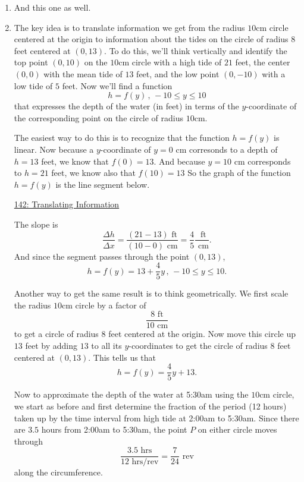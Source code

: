 \documentclass{ximera}
\begin{document}
\begin{example}
\begin{explanation}
\begin{enumerate}
\item And this one as well.

\item The key idea is to translate information we get from the radius $10$cm circle centered at the origin to information about the tides on the circle of radius $8$ feet centered at $(0,13)$. To do this, we'll think vertically and identify the top point $(0,10)$ on the $10$cm circle with a high tide of $21$ feet, the center $(0,0)$ with the mean tide of $13$ feet, and the low point $(0,-10)$ with a low tide of $5$ feet. Now we'll find a function
\[
 h = f(y) \, , \, -10 \leq y \leq 10
\]
that expresses the depth of the water (in feet) in terms of the $y$-coordinate of the corresponding point on the circle of radius $10$cm.

The easiest way to do this is to recognize that the function $h=f(y)$ is linear. Now because a $y$-coordinate of $y=0$ cm corresonds to a depth of $h=13$ feet, we know that $f(0)=13$. And because $y=10$ cm corresponds to $h=21$ feet, we know also that $f(10)=13$ So the graph of the function $h = f(y)$ is the line segment below.

\begin{onlineOnly}
    \begin{center}
\end{center}
\end{onlineOnly}

\href{https://www.desmos.com/calculator/vauspsqfnc}{142: Translating Information}

The slope is 
\[
   \frac{\Delta h}{\Delta x} = \frac{(21-13)\text{ ft}}{(10-0) \text{ cm}} = \frac{4}{5} \frac{\text{ ft}}{\text{ cm}}. 
\]
And since the segment passes through the point $(0,13)$, 
\[
  h = f(y) = 13 + \frac{4}{5}y \, , \, -10 \leq y \leq 10 .
\]

Another way to get the same result is to think geometrically. We first scale the radius $10$cm circle by a factor of 
\[
   \frac{8\text{ ft}}{10\text{ cm}}
\]
to get a circle of radius $8$ feet centered at the origin. Now move this circle up $13$ feet by adding $13$ to all its $y$-coordinates to get the circle of radius $8$ feet centered at $(0,13)$. This tells us that
\[   
    h = f(y) = \frac{4}{5}y + 13.
\]

Now to approximate the depth of the water at 5:30am using the $10$cm circle, we start as before and first determine the fraction of the period (12 hours) taken up by the time interval from high tide at 2:00am to 5:30am. Since there are $3.5$ hours from 2:00am to 5:30am, the point $P$ on either circle moves through 
\[
  \frac{3.5\text{ hrs}}{12 \text{ hrs/rev}} = \frac{7}{24} \text{ rev}
\]
along the circumference.


\end{enumerate}
\end{explanation}
\end{example}
\end{document}
